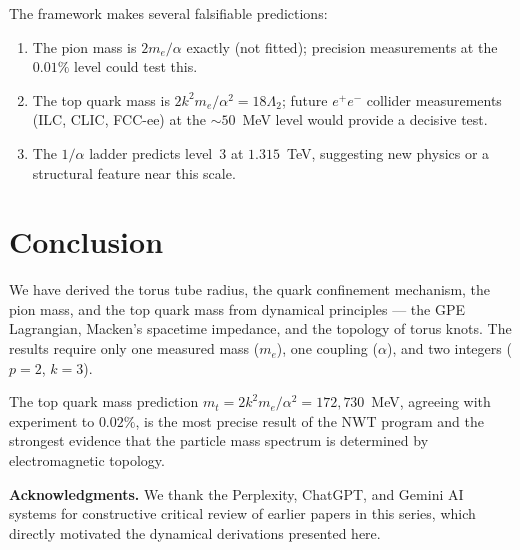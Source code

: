 \documentclass[11pt,a4paper]{article}
\begin{document}
The framework makes several falsifiable predictions:
\begin{enumerate}
\item The pion mass is $2m_e/\alpha$ exactly (not fitted);
  precision measurements at the $0.01\%$ level could test this.
\item The top quark mass is $2k^2 m_e/\alpha^2 = 18\Lambda_2$;
  future $e^+e^-$ collider measurements (ILC, CLIC, FCC-ee) at
  the $\sim 50$~MeV level would provide a decisive test.
\item The $1/\alpha$ ladder predicts level~3 at $1.315$~TeV,
  suggesting new physics or a structural feature near this scale.
\end{enumerate}


\section{Conclusion}
\label{sec:conclusion}

We have derived the torus tube radius, the quark confinement mechanism,
the pion mass, and the top quark mass from dynamical principles ---
the GPE Lagrangian, Macken's spacetime impedance, and the topology of
torus knots.  The results require only one measured mass ($m_e$), one
coupling ($\alpha$), and two integers ($p = 2$, $k = 3$).

The top quark mass prediction $m_t = 2k^2 m_e/\alpha^2 = 172{,}730$~MeV,
agreeing with experiment to $0.02\%$, is the most precise result of the
NWT program and the strongest evidence that the particle mass spectrum
is determined by electromagnetic topology.

\bigskip
\noindent\textbf{Acknowledgments.}
We thank the Perplexity, ChatGPT, and Gemini AI systems for constructive
critical review of earlier papers in this series, which directly
motivated the dynamical derivations presented here.
\end{document}
